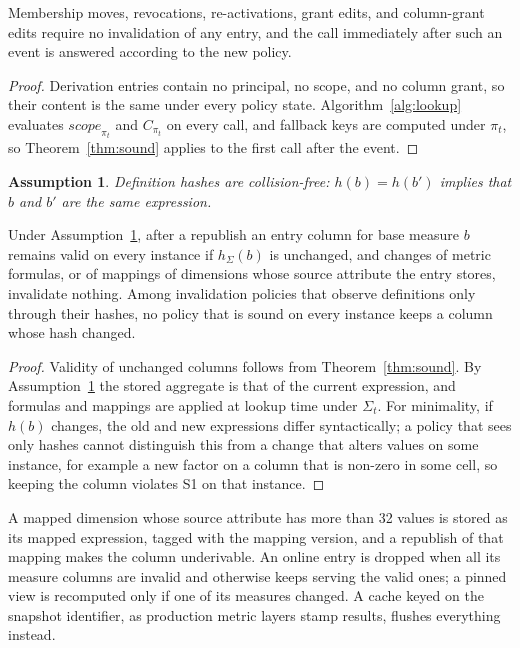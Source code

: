 \documentclass[sigconf, nonacm]{acmart}
\newtheorem{assumption}[theorem]{Assumption}%
\newcommand{\scope}{\mathit{scope}}
\begin{document}
\begin{theorem}
\label{thm:events}
Membership moves, revocations, re-activations, grant edits, and column-grant edits require no invalidation of any entry, and the call immediately after such an event is answered according to the new policy.
\end{theorem}
\begin{proof}
Derivation entries contain no principal, no scope, and no column grant, so their content is the same under every policy state. Algorithm~\ref{alg:lookup} evaluates $\scope_{\pi_t}$ and $C_{\pi_t}$ on every call, and fallback keys are computed under $\pi_t$, so Theorem~\ref{thm:sound} applies to the first call after the event.
\end{proof}

\begin{assumption}
\label{ass:hash}
Definition hashes are collision-free: $h(b)=h(b')$ implies that $b$ and $b'$ are the same expression.
\end{assumption}

\begin{theorem}
\label{thm:republish}
Under Assumption~\ref{ass:hash}, after a republish an entry column for base measure $b$ remains valid on every instance if $h_\Sigma(b)$ is unchanged, and changes of metric formulas, or of mappings of dimensions whose source attribute the entry stores, invalidate nothing. Among invalidation policies that observe definitions only through their hashes, no policy that is sound on every instance keeps a column whose hash changed.
\end{theorem}
\begin{proof}
Validity of unchanged columns follows from Theorem~\ref{thm:sound}. By Assumption~\ref{ass:hash} the stored aggregate is that of the current expression, and formulas and mappings are applied at lookup time under $\Sigma_t$. For minimality, if $h(b)$ changes, the old and new expressions differ syntactically; a policy that sees only hashes cannot distinguish this from a change that alters values on some instance, for example a new factor on a column that is non-zero in some cell, so keeping the column violates S1 on that instance.
\end{proof}

A mapped dimension whose source attribute has more than 32 values is stored as its mapped expression, tagged with the mapping version, and a republish of that mapping makes the column underivable. An online entry is dropped when all its measure columns are invalid and otherwise keeps serving the valid ones; a pinned view is recomputed only if one of its measures changed. A cache keyed on the snapshot identifier, as production metric layers stamp results, flushes everything instead.
\end{document}
